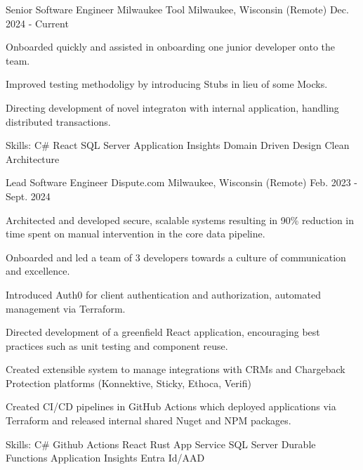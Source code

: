 

\begin{cventries}

\cventry
{Senior Software Engineer} %
{Milwaukee Tool} %
{Milwaukee, Wisconsin (Remote)} %
{Dec. 2024 - Current} %
{
  \begin{cvitems} %
    \item {Onboarded quickly and assisted in onboarding one junior developer onto the team.}
    \item {Improved testing methodoligy by introducing Stubs in lieu of some Mocks.}
    \item {Directing development of novel integraton with internal application, handling distributed transactions.}
    \item {Skills: C\# \textbullet{} React \textbullet{} SQL Server \textbullet{} Application Insights \textbullet{} Domain Driven Design \textbullet{} Clean Architecture}
  \end{cvitems}
}

  \cventry
    {Lead Software Engineer} %
    {Dispute.com} %
    {Milwaukee, Wisconsin (Remote)} %
    {Feb. 2023 - Sept. 2024} %
    {
      \begin{cvitems} %
        \item {Architected and developed secure, scalable systems resulting in 90\% reduction in time spent on 
                manual intervention in the core data pipeline.}
        \item {Onboarded and led a team of 3 developers towards a culture of communication and excellence.}
        \item {Introduced Auth0 for client authentication and authorization, automated management via Terraform.}
        \item {Directed development of a greenfield React application, encouraging best practices such as unit testing and component reuse.}
        \item {Created extensible system to manage integrations with CRMs and Chargeback Protection platforms (Konnektive, Sticky, Ethoca, Verifi)}
        \item {Created CI/CD pipelines in GitHub Actions which deployed applications via Terraform and released internal shared Nuget and NPM packages.}
        \item {Skills: C\# \textbullet{} Github Actions \textbullet{} React \textbullet{} Rust \textbullet{} App Service \textbullet{} SQL Server \textbullet{} Durable Functions \textbullet{} Application Insights \textbullet{} Entra Id/AAD}
      \end{cvitems}
    }


\end{cventries}
